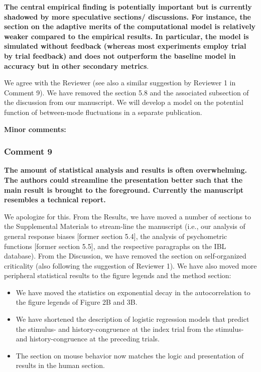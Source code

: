 \documentclass[
]{article}
\begin{document}
\textbf{The central empirical finding is potentially important but is
currently shadowed by more speculative sections/ discussions. For
instance, the section on the adaptive merits of the computational model
is relatively weaker compared to the empirical results. In particular,
the model is simulated without feedback (whereas most experiments employ
trial by trial feedback) and does not outperform the baseline model in
accuracy but in other secondary metrics}.

We agree with the Reviewer (see also a similar suggestion by Reviewer 1
in Comment 9). We have removed the section 5.8 and the associated
subsection of the discussion from our manuscript. We will develop a
model on the potential function of between-mode fluctuations in a
separate publication.

\textbf{Minor comments:}

\hypertarget{comment-9-1}{%
\subsubsection{Comment 9}\label{comment-9-1}}

\textbf{The amount of statistical analysis and results is often
overwhelming. The authors could streamline the presentation better such
that the main result is brought to the foreground. Currently the
manuscript resembles a technical report.}

We apologize for this. From the Results, we have moved a number of
sections to the Supplemental Materials to stream-line the manuscript
(i.e., our analysis of general response biases {[}former section 5.4{]},
the analysis of psychometric functions {[}former section 5.5{]}, and the
respective paragraphs on the IBL database). From the Discussion, we have
removed the section on self-organized criticality (also following the
suggestion of Reviewer 1). We have also moved more peripheral
statistical results to the figure legends and the method section:

\begin{itemize}
\item
  We have moved the statistics on exponential decay in the
  autocorrelation to the figure legends of Figure 2B and 3B.
\item
  We have shortened the description of logistic regression models that
  predict the stimulus- and history-congruence at the index trial from
  the stimulus- and history-congruence at the preceding trials.
\item
  The section on mouse behavior now matches the logic and presentation
  of results in the human section.
\end{itemize}
\end{document}
